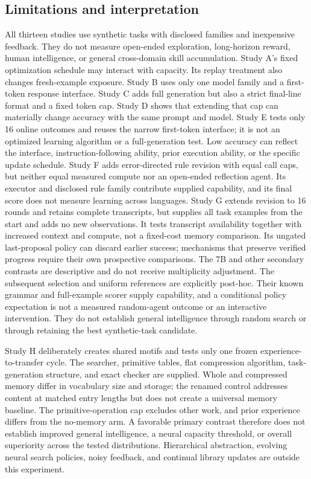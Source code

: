 \documentclass[11pt]{article}
\begin{document}
\subsection{Limitations and interpretation}
All thirteen studies use synthetic tasks with disclosed families and inexpensive
feedback. They do not measure open-ended exploration, long-horizon reward,
human intelligence, or general cross-domain skill accumulation. Study A's
fixed optimization schedule may interact with capacity. Its replay treatment
also changes fresh-example exposure. Study B uses only one model family and
a first-token response interface. Study C adds full generation but also a
strict final-line format and a fixed token cap. Study D shows that extending that cap can materially
change accuracy with the same prompt and model. Study E tests only 16 online
outcomes and reuses the narrow first-token interface; it is not an optimized
learning algorithm or a full-generation test. Low accuracy can reflect the
interface, instruction-following ability, prior execution ability, or the
specific update schedule. Study F adds error-directed rule revision with
equal call caps, but neither equal measured compute nor an open-ended
reflection agent. Its executor and disclosed rule family contribute supplied
capability, and its final score does not measure learning across languages.
Study G extends revision to 16 rounds and retains complete transcripts,
but supplies all task examples from the start and adds no new observations.
It tests transcript availability together with increased context and compute,
not a fixed-cost memory comparison. Its ungated last-proposal policy can
discard earlier success; mechanisms that preserve verified progress require
their own prospective comparisons. The 7B and other secondary contrasts are
descriptive and do not receive multiplicity adjustment.
The subsequent selection and uniform references are explicitly post-hoc.
Their known grammar and full-example scorer supply capability, and a
conditional policy expectation is not a measured random-agent outcome or
an interactive intervention. They do not establish general intelligence
through random search or through retaining the best synthetic-task candidate.

Study H deliberately creates shared motifs and tests only one frozen
experience-to-transfer cycle. The searcher, primitive tables, flat compression
algorithm, task-generation structure, and exact checker are supplied. Whole
and compressed memory differ in vocabulary size and storage; the renamed
control addresses content at matched entry lengths but does not create a
universal memory baseline. The primitive-operation cap excludes other work,
and prior experience differs from the no-memory arm. A favorable primary
contrast therefore does not establish improved general intelligence, a neural
capacity threshold, or overall superiority across the tested distributions.
Hierarchical abstraction, evolving neural search policies, noisy feedback,
and continual library updates are outside this experiment.
\end{document}
